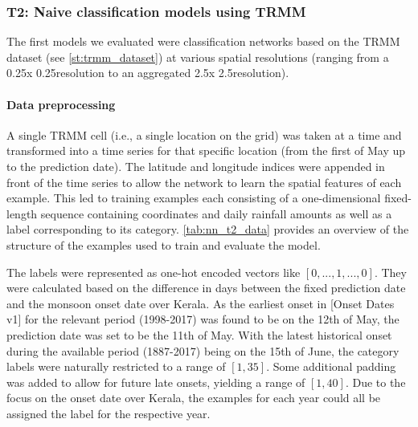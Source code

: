 \subsubsection{T2: Naive classification models using TRMM}
\label{sst:nn_t2}
The first models we evaluated were classification networks based on the TRMM dataset (see \cref{st:trmm_dataset}) at various spatial resolutions (ranging from a 0.25\degree x 0.25\degree resolution to an aggregated 2.5\degree x 2.5\degree resolution).

\paragraph{Data preprocessing}
\label{ssst:nn_t2_data}
A single TRMM cell (i.e., a single location on the grid) was taken at a time and transformed into a time series for that specific location (from the first of May up to the prediction date). The latitude and longitude indices were appended in front of the time series to allow the network to learn the spatial features of each example. This led to training examples each consisting of a one-dimensional fixed-length sequence containing coordinates and daily rainfall amounts as well as a label corresponding to its category. \cref{tab:nn_t2_data} provides an overview of the structure of the examples used to train and evaluate the model.

The labels were represented as one-hot encoded vectors like $\left[ 0, ..., 1, ..., 0 \right]$. They were calculated based on the difference in days between the fixed prediction date and the monsoon onset date over Kerala. As the earliest onset in [Onset Dates v1] for the relevant period (1998-2017) was found to be on the 12th of May, the prediction date was set to be the 11th of May. With the latest historical onset during the available period (1887-2017) being on the 15th of June, the category labels were naturally restricted to a range of $\left[ 1, 35 \right]$. Some additional padding was added to allow for future late onsets, yielding a range of $\left[ 1, 40 \right]$. Due to the focus on the onset date over Kerala, the examples for each year could all be assigned the label for the respective year.

